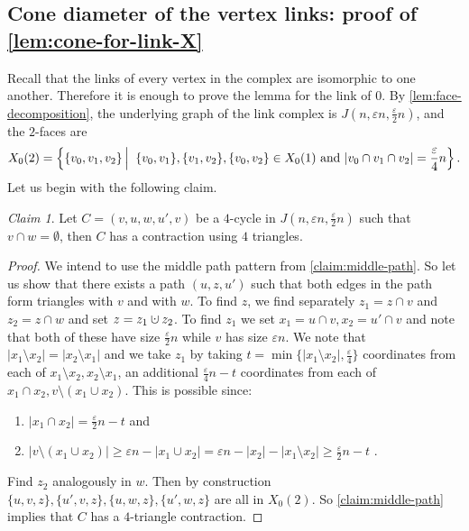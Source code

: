 \documentclass[10pt,a4paper]{article}
\newcommand{\prettyref}[1]{\cref{#1}}
\theoremstyle{definition}
\theoremstyle{remark}
\newtheorem{claim}[theorem]{Claim}
\newcommand{\abs}[1]{\lvert#1\rvert}
\newcommand\sett[2]{\left\{ #1 \left| \; \vphantom{#1 #2} \right. #2  \right\}}
\newcommand{\set}[1]{\{#1\}}
\renewcommand{\leq}{\leqslant}
\renewcommand{\geq}{\geqslant}
\renewcommand{\ge}{\geqslant}
\numberwithin{equation}{section}
\newcommand{\dunion}{\mathbin{\mathaccent\cdot\cup}}
\let\pref=\prettyref
\begin{document}
\subsection[Cone diameter of the vertex links]{Cone diameter of the vertex links: proof of \pref{lem:cone-for-link-X}}
Recall that the links of every vertex in the complex are isomorphic to one another. Therefore it is enough to prove the lemma for the link of \(0\). By \pref{lem:face-decomposition}, the underlying graph of the link complex is \(J(n,\varepsilon n, \frac{\varepsilon}{2}n)\), and the $2$-faces are 
\[ X_0(2) = \sett{\set{v_0,v_1,v_2}}{\set{v_0,v_1},\set{v_1,v_2},\set{v_0,v_2} \in X_0(1) \text{ and }\abs{v_0 \cap v_1 \cap v_2} = \frac{\varepsilon}{4}n}.\]
Let us begin with the following claim.
\begin{claim} \label{claim:contracting-almost-disjoint-4-cycles-link-X}
    Let \(C = (v,u,w,u',v)\) be a \(4\)-cycle in \(J(n,\varepsilon n, \frac{\varepsilon}{2}n)\) 
    such that \(v \cap w = \emptyset \), then \(C\) has a contraction using \(4\) triangles.
\end{claim}

\begin{proof}
    We intend to use the middle path pattern from \pref{claim:middle-path}. So let us show that there exists a path \((u,z,u')\) such that both edges in the path form triangles with \(v\) and with \(w\). 
    To find $z$, we find separately \(z_1 = z \cap v\) and \(z_2 = z \cap w\) and set \(z= z_1 \dunion z_2\). To find \(z_1\) we set \(x_1=u \cap v , x_2 = u' \cap v\) and note that both of these have size \(\frac{\varepsilon}{2}n\) while $v$ has size $\varepsilon n$. We note that \(\abs{x_1 \setminus x_2} = \abs{x_2 \setminus x_1}\) and we take \(z_1\) by taking \(t=\min \set{\abs{x_1 \setminus x_2}, \frac{\varepsilon}{4}}\) coordinates from each of \(x_1 \setminus x_2, x_2 \setminus x_1\), an additional \(\frac{\varepsilon}{4}n - t\) coordinates from each of \(x_1 \cap x_2, v \setminus (x_1 \cup x_2)\). This is possible since:
    \begin{enumerate}
        \item \(\abs{x_1 \cap x_2} = \frac{\varepsilon}{2}n-t\) and
        \item  \(\abs{v \setminus (x_1 \cup x_2) } \geq \varepsilon n - \abs{x_1 \cup x_2} = \varepsilon n -\abs{x_2} - \abs{x_1 \setminus x_2} \ge \frac{\varepsilon}{2}n-t \) .
    \end{enumerate}
    Find $z_2$ analogously in $w$. Then by construction $\{u,v,z\},\{u',v,z\},\{u,w,z\},\{u',w,z\}$ are all in $X_0(2)$. So \pref{claim:middle-path} implies that $C$ has a \(4\)-triangle contraction. 
\end{proof}
\end{document}
